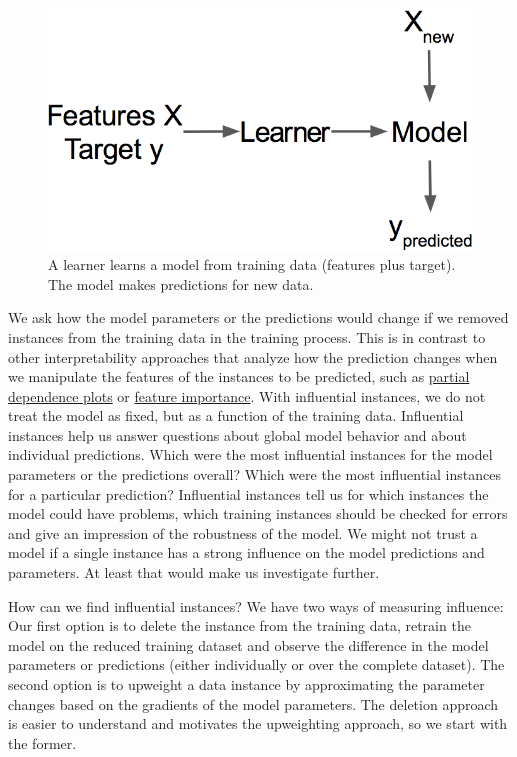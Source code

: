 \documentclass[
  12pt,
]{krantz}
\begin{document}
\begin{figure}

{\centering \includegraphics[width=\textwidth]{images/learner} 

}

\caption{A learner learns a model from training data (features plus target). The model makes predictions for new data.}\label{fig:learner}
\end{figure}

We ask how the model parameters or the predictions would change if we removed instances from the training data in the training process.
This is in contrast to other interpretability approaches that analyze how the prediction changes when we manipulate the features of the instances to be predicted, such as \protect\hyperlink{pdp}{partial dependence plots} or \protect\hyperlink{feature-importance}{feature importance}.
With influential instances, we do not treat the model as fixed, but as a function of the training data.
Influential instances help us answer questions about global model behavior and about individual predictions.
Which were the most influential instances for the model parameters or the predictions overall?
Which were the most influential instances for a particular prediction?
Influential instances tell us for which instances the model could have problems, which training instances should be checked for errors and give an impression of the robustness of the model.
We might not trust a model if a single instance has a strong influence on the model predictions and parameters.
At least that would make us investigate further.

How can we find influential instances?
We have two ways of measuring influence:
Our first option is to delete the instance from the training data, retrain the model on the reduced training dataset and observe the difference in the model parameters or predictions (either individually or over the complete dataset).
The second option is to upweight a data instance by approximating the parameter changes based on the gradients of the model parameters.
The deletion approach is easier to understand and motivates the upweighting approach, so we start with the former.
\end{document}
